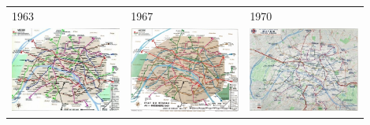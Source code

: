 \begin{tabular}{|m{0.3\linewidth}|m{0.3\linewidth}|m{0.3\linewidth}|}
\hline
1963 & 1967 & 1970\\
\includegraphics[width=\linewidth]{img/1963}&
\includegraphics[width=\linewidth]{img/1967}&
\includegraphics[width=\linewidth]{img/1970}\\
\hline
\end{tabular}


